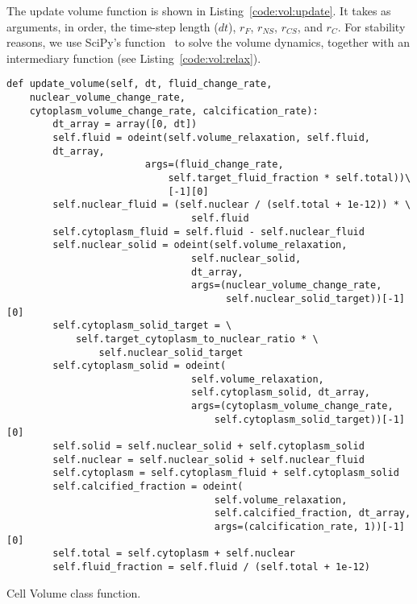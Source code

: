 The update volume function is shown in Listing~\ref{code:vol:update}. It takes as arguments, in order, the time-step length ($dt$), $r_F$, $r_{NS}$, $r_{CS}$, and $r_C$. For stability reasons, we use SciPy's  function~\cite{2020SciPy-NMeth} to solve the volume dynamics, together with an intermediary function  (see Listing~\ref{code:vol:relax}). 

\begin{listing}[!htbp]
\begin{verbatim}
def update_volume(self, dt, fluid_change_rate, 
    nuclear_volume_change_rate,
    cytoplasm_volume_change_rate, calcification_rate):
        dt_array = array([0, dt])
        self.fluid = odeint(self.volume_relaxation, self.fluid, 
        dt_array,
                        args=(fluid_change_rate, 
                            self.target_fluid_fraction * self.total))\
                            [-1][0]
        self.nuclear_fluid = (self.nuclear / (self.total + 1e-12)) * \
                                self.fluid
        self.cytoplasm_fluid = self.fluid - self.nuclear_fluid
        self.nuclear_solid = odeint(self.volume_relaxation, 
                                self.nuclear_solid, 
                                dt_array,
                                args=(nuclear_volume_change_rate, 
                                      self.nuclear_solid_target))[-1][0]
        self.cytoplasm_solid_target = \
            self.target_cytoplasm_to_nuclear_ratio * \
                self.nuclear_solid_target
        self.cytoplasm_solid = odeint(
                                self.volume_relaxation, 
                                self.cytoplasm_solid, dt_array,
                                args=(cytoplasm_volume_change_rate, 
                                    self.cytoplasm_solid_target))[-1][0]
        self.solid = self.nuclear_solid + self.cytoplasm_solid 
        self.nuclear = self.nuclear_solid + self.nuclear_fluid
        self.cytoplasm = self.cytoplasm_fluid + self.cytoplasm_solid
        self.calcified_fraction = odeint(
                                    self.volume_relaxation, 
                                    self.calcified_fraction, dt_array,
                                    args=(calcification_rate, 1))[-1][0]
        self.total = self.cytoplasm + self.nuclear
        self.fluid_fraction = self.fluid / (self.total + 1e-12)
\end{verbatim}
\caption{Cell Volume class \code{update\_volume} function.}\label{code:vol:update}
\end{listing}

